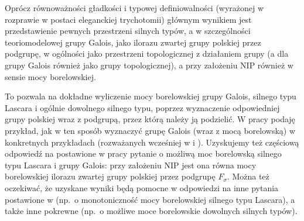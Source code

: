 \documentclass[12pt,a4paper]{article}
\begin{document}
	Oprócz równoważności gładkości i typowej definiowalności (wyrażonej w rozprawie w postaci eleganckiej trychotomii) głównym wynikiem jest przedstawienie pewnych przestrzeni silnych typów, a w szczególności teoriomodelowej grupy Galois, jako ilorazu zwartej grupy polskiej przez podgrupę, w ogólności jako przestrzeni topologicznej z działaniem grupy (a dla grupy Galois również jako grupy topologicznej), a przy założeniu NIP również w sensie mocy borelowskiej.
	
	To pozwala na dokładne wyliczenie mocy borelowskiej grupy Galois, silnego typu Lascara i ogólnie dowolnego silnego typu, poprzez wyznaczenie odpowiedniej grupy polskiej wraz z podgrupą, przez którą należy ją podzielić. W pracy podaję przykład, jak w ten sposób wyznaczyć grupę Galois (wraz z mocą borelowską) w konkretnych przykładach (rozważanych wcześniej w \cite{CLPZ01} i \cite{KPS13}). Uzyskujemy też częściową odpowiedź na postawione w pracy \cite{KPS13} pytanie o możliwą moc borelowską silnego typu Lascara i grupy Galois: przy założeniu NIP jest ona równa mocy borelowskiej ilorazu zwartej grupy polskiej przez podgrupę $F_\sigma$. Można też oczekiwać, że uzyskane wyniki będą pomocne w odpowiedzi na inne pytania postawione w \cite{KPS13} (np.\ o monotoniczność mocy borelowskiej silnego typu Lascara), a także inne pokrewne (np.\ o możliwe moce borelowskie dowolnych silnych typów).
	\AtNextBibliography{\small}
	\vspace{-1em}
	\printbibliography
\end{document}
